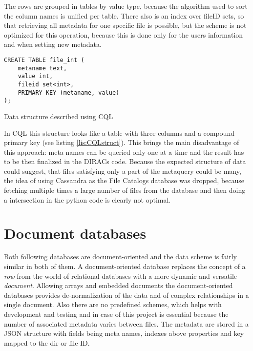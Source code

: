 The rows are grouped in tables by value type, because the algorithm used to sort the
column names is unified per table. There also is an index over fileID sets, 
so that retrieving all metadata for one specific file is possible, but the scheme is 
not optimized for this operation, because this is done only for the users information and
when setting new metadata.

\begin{listing}
\begin{verbatim}
CREATE TABLE file_int (
    metaname text,
    value int,
    fileid set<int>,
    PRIMARY KEY (metaname, value)
);
\end{verbatim}
\caption{Data structure described using CQL}
\label{lis:CQLstruct}
\end{listing}

In CQL this structure looks like a table with three columns and a compound primary key (see listing 
\ref{lis:CQLstruct}). 
This brings the main disadvantage of this approach: meta names can be queried only one at a time and
the result has to be then finalized in the DIRACs code. Because the expected structure of data could
suggest, that files satisfying only a part of the metaquery could be many, the idea of using 
Cassandra as the File Catalogs database was dropped, because fetching multiple times a large number of 
files from the database and then doing a intersection in the python code is clearly not optimal. 


\section{Document databases}

Both following databases are document-oriented and the data scheme is fairly similar in both
of them. A document-oriented database replaces the concept of a \textit{row} from the world of relational 
databases with a more dynamic and versatile \textit{document}. Allowing arrays and embedded documents the 
document-oriented databases provides de-normalization of the data and  of complex 
relationships in a single document. Also there are no predefined schemes, which helps with development 
and testing and in case of this project is essential because the number of associated metadata varies between 
files. The metadata are stored in a JSON structure with fields being meta names, indexes above properties and key 
mapped to the dir or file ID.


